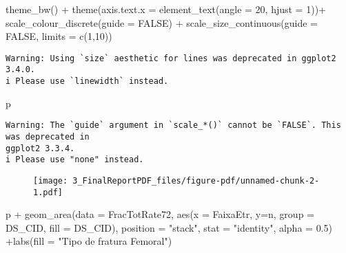 \documentclass[
  letterpaper,
  DIV=11,
  numbers=noendperiod]{scrartcl}
\newenvironment{Shaded}{\begin{snugshade}}{\end{snugshade}}
\newcommand{\AttributeTok}[1]{\textcolor[rgb]{0.40,0.45,0.13}{#1}}
\newcommand{\ConstantTok}[1]{\textcolor[rgb]{0.56,0.35,0.01}{#1}}
\newcommand{\DecValTok}[1]{\textcolor[rgb]{0.68,0.00,0.00}{#1}}
\newcommand{\FloatTok}[1]{\textcolor[rgb]{0.68,0.00,0.00}{#1}}
\newcommand{\FunctionTok}[1]{\textcolor[rgb]{0.28,0.35,0.67}{#1}}
\newcommand{\NormalTok}[1]{\textcolor[rgb]{0.00,0.23,0.31}{#1}}
\newcommand{\SpecialCharTok}[1]{\textcolor[rgb]{0.37,0.37,0.37}{#1}}
\newcommand{\StringTok}[1]{\textcolor[rgb]{0.13,0.47,0.30}{#1}}
\begin{document}
\begin{Shaded}
\begin{Highlighting}[]
    \FunctionTok{theme\_bw}\NormalTok{() }\SpecialCharTok{+}
    \FunctionTok{theme}\NormalTok{(}\AttributeTok{axis.text.x =} \FunctionTok{element\_text}\NormalTok{(}\AttributeTok{angle =} \DecValTok{20}\NormalTok{, }\AttributeTok{hjust =} \DecValTok{1}\NormalTok{))}\SpecialCharTok{+}
    \FunctionTok{scale\_colour\_discrete}\NormalTok{(}\AttributeTok{guide =} \ConstantTok{FALSE}\NormalTok{) }\SpecialCharTok{+}
    \FunctionTok{scale\_size\_continuous}\NormalTok{(}\AttributeTok{guide =} \ConstantTok{FALSE}\NormalTok{, }\AttributeTok{limits =} \FunctionTok{c}\NormalTok{(}\DecValTok{1}\NormalTok{,}\DecValTok{10}\NormalTok{))}
\end{Highlighting}
\end{Shaded}

\begin{verbatim}
Warning: Using `size` aesthetic for lines was deprecated in ggplot2 3.4.0.
i Please use `linewidth` instead.
\end{verbatim}

\begin{Shaded}
\begin{Highlighting}[]
\NormalTok{p}
\end{Highlighting}
\end{Shaded}

\begin{verbatim}
Warning: The `guide` argument in `scale_*()` cannot be `FALSE`. This was deprecated in
ggplot2 3.3.4.
i Please use "none" instead.
\end{verbatim}

\begin{figure}[H]

{\centering \texttt{[image: 3\_FinalReportPDF\_files/figure-pdf/unnamed-chunk-2-1.pdf]}

}

\end{figure}

\begin{Shaded}
\begin{Highlighting}[]
\NormalTok{p }\SpecialCharTok{+} \FunctionTok{geom\_area}\NormalTok{(}\AttributeTok{data =}\NormalTok{ FracTotRate72, }\FunctionTok{aes}\NormalTok{(}\AttributeTok{x =}\NormalTok{ FaixaEtr, }\AttributeTok{y=}\NormalTok{n, }\AttributeTok{group =}\NormalTok{ DS\_CID, }\AttributeTok{fill =}\NormalTok{ DS\_CID), }\AttributeTok{position =} \StringTok{"stack"}\NormalTok{, }\AttributeTok{stat =} \StringTok{"identity"}\NormalTok{, }\AttributeTok{alpha =} \FloatTok{0.5}\NormalTok{) }\SpecialCharTok{+}\FunctionTok{labs}\NormalTok{(}\AttributeTok{fill =} \StringTok{"Tipo de fratura Femoral"}\NormalTok{)}
\end{Highlighting}
\end{Shaded}
\end{document}
